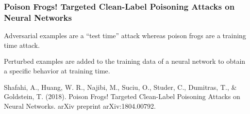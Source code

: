 \documentclass[9pt]{beamer}
\begin{document}
\begin{frame}
  \frametitle{Poison Frogs! Targeted Clean-Label Poisoning Attacks on
    Neural Networks}

  \begin{center}
  \end{center}

  \medskip

  Adversarial examples are a ``test time'' attack whereas poison frogs
  are a training time attack.

  \medskip

  Perturbed examples are added to the training data of a neural
  network to obtain a specific behavior at training time.

  \bigskip

  {\scriptsize Shafahi, A., Huang, W. R., Najibi, M., Suciu, O.,
    Studer, C., Dumitras, T., \& Goldstein, T. (2018). Poison Frogs!
    Targeted Clean-Label Poisoning Attacks on Neural Networks. arXiv
    preprint arXiv:1804.00792.}
\end{frame}
\end{document}
